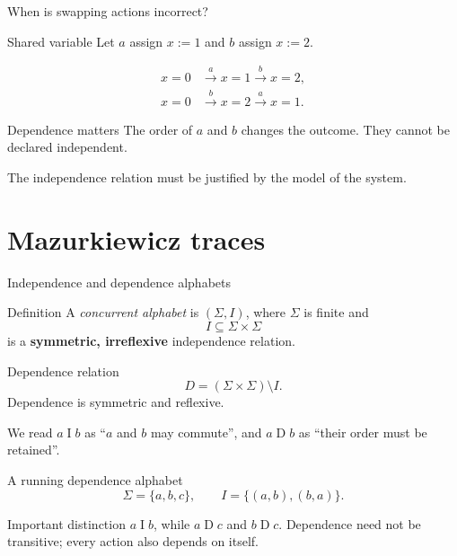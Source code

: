 \documentclass[t,11pt]{beamer}
\newcommand{\ind}{\mathrel{I}}
\newcommand{\dep}{\mathrel{D}}
\begin{document}
\begin{frame}{When is swapping actions incorrect?}
  \begin{block}{Shared variable}
    Let $a$ assign $x:=1$ and $b$ assign $x:=2$.
  \end{block}
  \[
  \begin{aligned}
    x=0&\xrightarrow{a}x=1\xrightarrow{b}x=2,\\[5pt]
    x=0&\xrightarrow{b}x=2\xrightarrow{a}x=1.
  \end{aligned}
  \]
  \begin{block}{Dependence matters}
    The order of $a$ and $b$ changes the outcome. They cannot be declared independent.
  \end{block}
  \vspace{0.25cm}
  The independence relation must be justified by the model of the system.
\end{frame}

\section{Mazurkiewicz traces}

\begin{frame}{Independence and dependence alphabets}
  \begin{block}{Definition}
    A \emph{concurrent alphabet} is $(\Sigma,I)$, where $\Sigma$ is finite and
    \[
       I\subseteq\Sigma\times\Sigma
    \]
    is a \textbf{symmetric, irreflexive} independence relation.
  \end{block}
  \begin{block}{Dependence relation}
    \[
      D=(\Sigma\times\Sigma)\setminus I.
    \]
    Dependence is symmetric and reflexive.
  \end{block}
  \vspace{0.1cm}
  We read $a\ind b$ as ``$a$ and $b$ may commute'', and $a\dep b$ as ``their order must be retained''.
\end{frame}

\begin{frame}{A running dependence alphabet}
  \[
    \Sigma=\{a,b,c\},\qquad I=\{(a,b),(b,a)\}.
  \]
  \begin{center}
  \end{center}
  \begin{block}{Important distinction}
    $a\ind b$, while $a\dep c$ and $b\dep c$. Dependence need not be transitive; every action also depends on itself.
  \end{block}
\end{frame}
\end{document}
